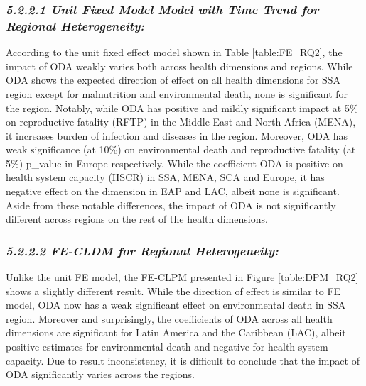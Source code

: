 \subsubsection*{\quad \quad \textit{5.2.2.1 Unit Fixed Model Model with Time Trend for Regional Heterogeneity:}}

According to the unit fixed effect model shown in Table \ref{table:FE_RQ2}, the impact of ODA weakly varies both across health dimensions and regions. While ODA shows the expected direction of effect on all health dimensions for SSA region except for malnutrition and environmental death, none is significant for the region. Notably, while ODA has positive and mildly significant impact at 5\% on reproductive fatality (RFTP) in the Middle East and North Africa (MENA), it increases burden of infection and diseases in the region. Moreover, ODA has weak significance (at 10\%) on environmental death and reproductive fatality (at 5\%) p\_value in Europe respectively. While the coefficient ODA is positive on health system capacity (HSCR) in SSA, MENA, SCA and Europe, it has negative effect on the dimension in EAP and LAC, albeit none is significant. Aside from these notable differences, the impact of ODA is not significantly different across regions on the rest of the health dimensions.


\subsubsection*{\quad \quad \textit{5.2.2.2 FE-CLDM for Regional Heterogeneity:}}

Unlike the unit FE model, the FE-CLPM presented in Figure \ref{table:DPM_RQ2} shows a slightly different result. While the direction of effect is similar to FE model, ODA now has a weak significant effect on environmental death in SSA region. Moreover and surprisingly, the coefficients of ODA across all health dimensions are significant for Latin America and the Caribbean (LAC), albeit positive estimates for environmental death and negative for health system capacity. Due to result inconsistency, it is difficult to conclude that the impact of ODA significantly varies across the regions.  



